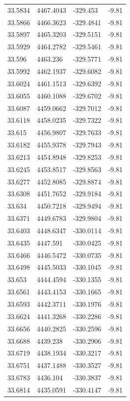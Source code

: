 \begin{table}[H]
\begin{tabular}{llll}
33.5834 & 4467.4043 & -329.453 & -9.81 \\
33.5866 & 4466.3623 & -329.4841 & -9.81 \\
33.5897 & 4465.3203 & -329.5151 & -9.81 \\
33.5929 & 4464.2782 & -329.5461 & -9.81 \\
33.596 & 4463.236 & -329.5771 & -9.81 \\
33.5992 & 4462.1937 & -329.6082 & -9.81 \\
33.6024 & 4461.1513 & -329.6392 & -9.81 \\
33.6055 & 4460.1088 & -329.6702 & -9.81 \\
33.6087 & 4459.0662 & -329.7012 & -9.81 \\
33.6118 & 4458.0235 & -329.7322 & -9.81 \\
33.615 & 4456.9807 & -329.7633 & -9.81 \\
33.6182 & 4455.9378 & -329.7943 & -9.81 \\
33.6213 & 4454.8948 & -329.8253 & -9.81 \\
33.6245 & 4453.8517 & -329.8563 & -9.81 \\
33.6277 & 4452.8085 & -329.8874 & -9.81 \\
33.6308 & 4451.7652 & -329.9184 & -9.81 \\
33.634 & 4450.7218 & -329.9494 & -9.81 \\
33.6371 & 4449.6783 & -329.9804 & -9.81 \\
33.6403 & 4448.6347 & -330.0114 & -9.81 \\
33.6435 & 4447.591 & -330.0425 & -9.81 \\
33.6466 & 4446.5472 & -330.0735 & -9.81 \\
33.6498 & 4445.5033 & -330.1045 & -9.81 \\
33.653 & 4444.4594 & -330.1355 & -9.81 \\
33.6561 & 4443.4153 & -330.1665 & -9.81 \\
33.6593 & 4442.3711 & -330.1976 & -9.81 \\
33.6624 & 4441.3268 & -330.2286 & -9.81 \\
33.6656 & 4440.2825 & -330.2596 & -9.81 \\
33.6688 & 4439.238 & -330.2906 & -9.81 \\
33.6719 & 4438.1934 & -330.3217 & -9.81 \\
33.6751 & 4437.1488 & -330.3527 & -9.81 \\
33.6783 & 4436.104 & -330.3837 & -9.81 \\
33.6814 & 4435.0591 & -330.4147 & -9.81 \\

\end{tabular}
\end{table}
